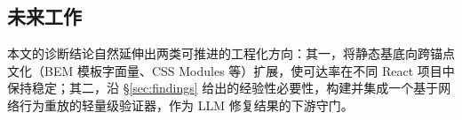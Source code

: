 \begin{table}[t]
\centering
\caption{解析器 strict/permissive 敏感性（koenig，$n=93$）。permissive 为本文所采用的假设；strict 关闭“动态属性值视为可能匹配”与“同文件祖先近似”两处过近似。}
\label{tab:resolver-sens}
\small
{}
\end{table}

\subsection{未来工作}
本文的诊断结论自然延伸出两类可推进的工程化方向：其一，将静态基底向跨锚点文化（BEM 模板字面量、CSS Modules 等）扩展，使可达率在不同 React 项目中保持稳定；其二，沿 \S\ref{sec:findings} 给出的经验性必要性，构建并集成一个基于网络行为重放的轻量级验证器，作为 LLM 修复结果的下游守门。
